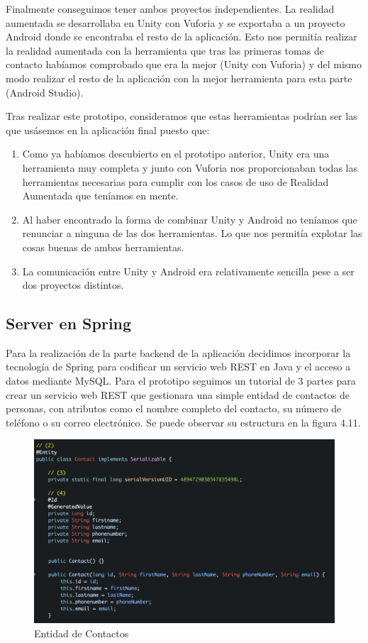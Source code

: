 Finalmente conseguimos tener ambos proyectos independientes. La realidad aumentada se desarrollaba en Unity con Vuforia y se exportaba a un proyecto Android donde se encontraba el resto de la aplicación.
Esto nos permitía realizar la realidad aumentada con la herramienta que tras las primeras tomas de contacto habíamos comprobado que era la mejor (Unity con Vuforia) y del mismo modo realizar el resto de la aplicación con la mejor herramienta para esta parte (Android Studio).

Tras realizar este prototipo, consideramos que estas herramientas podrían ser las que usásemos en la aplicación final puesto que:
\begin{enumerate}
    \item Como ya habíamos descubierto en el prototipo anterior, Unity era una herramienta muy completa y junto con Vuforia nos proporcionaban todas las herramientas necesarias para cumplir con los casos de uso de Realidad Aumentada que teníamos en mente.
    \item Al haber encontrado la forma de combinar Unity y Android no teníamos que renunciar a ninguna de las dos herramientas. Lo que nos permitía explotar las cosas buenas de ambas herramientas.
    \item La comunicación entre Unity y Android era relativamente sencilla pese a ser dos proyectos distintos.
\end{enumerate}


\subsection{Server en Spring} 
\label{makereference4.1.6}

Para la realización de la parte backend de la aplicación decidimos
incorporar la tecnología de Spring para codificar un servicio web REST en Java
y el acceso a datos mediante MySQL. Para el prototipo seguimos un tutorial\cite{tutorialspring} de 3 partes para crear un servicio web REST
que gestionara una simple entidad de contactos de personas, con atributos como el nombre completo del contacto, su número de teléfono o su correo electrónico. Se puede observar su estructura
en la figura 4.11.
    \begin{figure}[H]
        \centering
        \includegraphics[width=6in]{figures/ContactsEntity.png}
        \caption{Entidad de Contactos}
    \end{figure}

